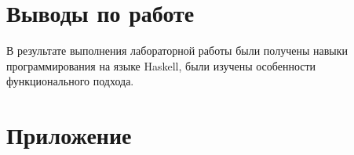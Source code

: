 \documentclass[a4paper,14pt]{extarticle}
\begin{document}
\section*{Выводы по работе}
В результате выполнения лабораторной работы были получены навыки программирования на языке Haskell, были изучены особенности функционального подхода.

\newpage

\section*{Приложение}
\inputminted[mathescape,linenos,breaklines]{haskell}{../src/main.hs}
\end{document}

